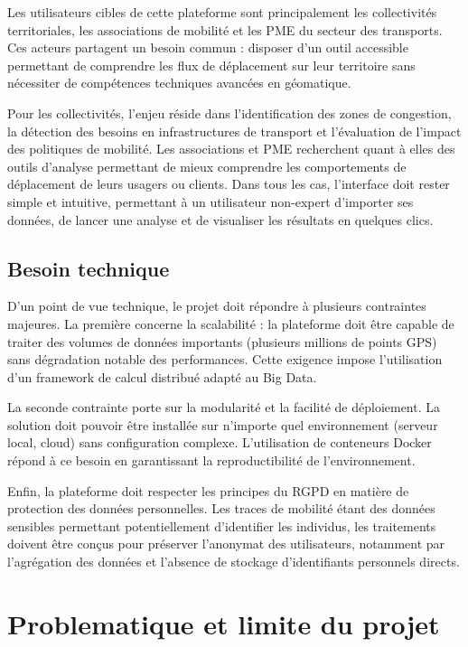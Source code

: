 \documentclass[french]{tai_info} %
\begin{document}
Les utilisateurs cibles de cette plateforme sont principalement les collectivités territoriales, les associations de mobilité et les PME du secteur des transports. Ces acteurs partagent un besoin commun : disposer d'un outil accessible permettant de comprendre les flux de déplacement sur leur territoire sans nécessiter de compétences techniques avancées en géomatique.

Pour les collectivités, l'enjeu réside dans l'identification des zones de congestion, la détection des besoins en infrastructures de transport et l'évaluation de l'impact des politiques de mobilité. Les associations et PME recherchent quant à elles des outils d'analyse permettant de mieux comprendre les comportements de déplacement de leurs usagers ou clients. Dans tous les cas, l'interface doit rester simple et intuitive, permettant à un utilisateur non-expert d'importer ses données, de lancer une analyse et de visualiser les résultats en quelques clics.

\subsection{Besoin technique}

D'un point de vue technique, le projet doit répondre à plusieurs contraintes majeures. La première concerne la scalabilité : la plateforme doit être capable de traiter des volumes de données importants (plusieurs millions de points GPS) sans dégradation notable des performances. Cette exigence impose l'utilisation d'un framework de calcul distribué adapté au Big Data.

La seconde contrainte porte sur la modularité et la facilité de déploiement. La solution doit pouvoir être installée sur n'importe quel environnement (serveur local, cloud) sans configuration complexe. L'utilisation de conteneurs Docker répond à ce besoin en garantissant la reproductibilité de l'environnement.

Enfin, la plateforme doit respecter les principes du RGPD en matière de protection des données personnelles. Les traces de mobilité étant des données sensibles permettant potentiellement d'identifier les individus, les traitements doivent être conçus pour préserver l'anonymat des utilisateurs, notamment par l'agrégation des données et l'absence de stockage d'identifiants personnels directs.

\section{Problematique et limite du projet}
\end{document}

